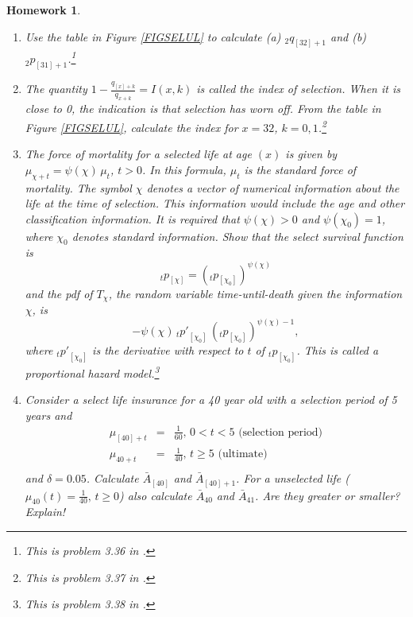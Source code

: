 \documentclass[11pt,fleqn,oneside]{book}
\newtheorem{homework}{Homework}
\begin{document}
\begin{homework}
\label{HW14}
\begin{enumerate} 
\item  Use the table in Figure  \ref{FIGSELUL} to calculate (a) $_2q_{[32]+1}$ and (b) $_2p_{[31]+1}$.\footnote{This is problem 3.36 in \cite{BOWERS}.}
\item The quantity $1-\frac{q_{[x]+k}}{q_{x+k}}=I(x,k)$ is called the \textit{index of selection}. When it is close to 0, the indication is that selection has worn off. From the table in Figure \ref{FIGSELUL}, calculate the index for $x=32$, $k=0,1$.\footnote{This is problem 3.37 in \cite{BOWERS}.}
\item The force of mortality for a selected life at age $(x)$ is given by $\mu_{\chi+t} = \psi(\chi)\,\mu_t$, $t>0$. In this formula, $\mu_t$ is the standard force of mortality. The symbol $\chi$ denotes a vector of numerical information about the life at the time of selection. This information would include the age and other classification information. It is required that $\psi(\chi)>0$ and $\psi(\chi_0)=1$, where $\chi_0$ denotes standard information. Show that the select survival function is
$$
{_tp_{[\chi]}} = \left({_tp_{[\chi_0]}}\right)^{\psi(\chi)} 
$$
and the pdf of $T_{\chi}$, the random variable time-until-death given the information $\chi$, is 
$$
-\psi(\chi) \, {_t{p'}_{[\chi_0]}}\, \left({_tp_{[\chi_0]}}\right)^{\psi(\chi)-1},  
$$
where $ {_t{p'}_{[\chi_0]}}$ is the derivative with respect to $t$ of $ {_t{p}_{[\chi_0]}}$. This is called a \textit{proportional hazard model}.\footnote{This is problem 3.38 in \cite{BOWERS}.} 
\item Consider a select life insurance for a 40 year old with a selection period of 5 years and
\begin{eqnarray*}
\mu_{[40]+t} &=& \frac{1}{60},\,0<t<5 \text{ (selection period)}\\
\mu_{40+t} &=& \frac{1}{40},\,t \geq 5 \text{ (ultimate)}\\
\end{eqnarray*}
and $\delta = 0.05$. Calculate $\bar{A}_{[40]}$ and $\bar{A}_{[40]+1}$. 
For a unselected life ($\mu_{40}(t) = \frac{1}{40},\,t \geq 0$) also calculate $\bar{A}_{40}$ and $\bar{A}_{41}$. Are they greater or smaller? Explain!
\end{enumerate}
\end{homework}
\end{document}
